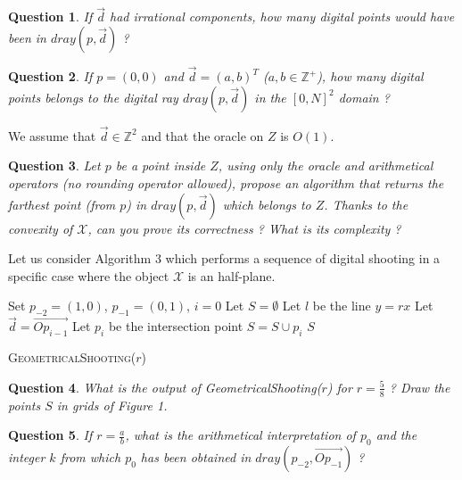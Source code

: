 \documentclass[a4paper, 11pt]{article}
\newtheorem{qu}{Question}
\begin{document}
\begin{qu}
  If  $\vec{d}$ had irrational components,  how
  many digital points would have been in $dray(p,\vec{d})$ ?
\end{qu}

\begin{qu}
  If $p=(0,0)$ and $\vec{d}=(a,b)^T$ ($a,b\in\mathbb{Z}^+$), how many digital points belongs
  to the digital ray  $dray(p,\vec{d})$ in the $[0,N]^2$ domain ?
\end{qu}


\noindent We assume that $\vec{d}\in\mathbb{Z}^2$ and that the oracle
on $Z$ is $O(1)$.

\begin{qu}
  Let $p$ be a point inside $Z$, using only the oracle and
  arithmetical operators (no rounding operator allowed), propose an
  algorithm that returns the farthest point (from $p$) in
  $dray(p,\vec{d})$ which belongs to $Z$. Thanks to the convexity of
  $\mathcal{X}$, can you prove its correctness ? What is its complexity ?
\end{qu}

\noindent Let us consider Algorithm 3 which performs a sequence of
digital shooting in a specific case where the object $\mathcal{X}$ is
an half-plane.

\begin{algorithm}[Hhtbp]
  Set $p_{-2}=(1,0)$, $p_{-1}=(0,1)$, $i=0$\;
  Let $S=\emptyset$\;
  Let $l$ be the line $y=rx$\;
  {  Let $\vec{d}=\vec{Op_{i-1}}$\;
     {Let $p_i$ be the intersection point\;
       $S = S\cup {p_i}$\;
     \Return $S$\;}
       }
  \caption{\textsc{GeometricalShooting}($r$)}
  \label{algo:gcd}
\end{algorithm}


\begin{qu}
  What is the output of {GeometricalShooting}($r$) for $r=\frac{5}{8}$
  ? Draw the points $S$  in grids of Figure 1.
\end{qu}


\begin{qu}
  If $r=\frac{a}{b}$, what is the arithmetical interpretation of $p_0$
  and the integer $k$ from which $p_0$ has been obtained in
  $dray(p_{-2},\vec{Op_{-1}})$ ?
\end{qu}
\end{document}
